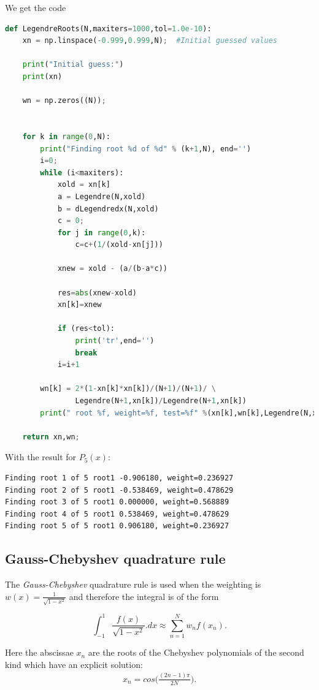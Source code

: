 \documentclass[11pt,letterpaper,titlepage]{article}
\newcommand{\beqn}{\begin{equation}
	\begin{aligned}}
\newcommand{\eeqn}{\end{aligned}
	\end{equation}}
\numberwithin{equation}{section}
\begin{document}
\begin{appendices}
We get the code

\begin{lstlisting}[language=python]
def LegendreRoots(N,maxiters=1000,tol=1.0e-10):
    xn = np.linspace(-0.999,0.999,N);  #Initial guessed values

    print("Initial guess:")
    print(xn)

    wn = np.zeros((N));
    
    
    for k in range(0,N):
        print("Finding root %d of %d" % (k+1,N), end='')
        i=0;
        while (i<maxiters):
            xold = xn[k]
            a = Legendre(N,xold)
            b = dLegendredx(N,xold)
            c = 0;
            for j in range(0,k):
                c=c+(1/(xold-xn[j]))
            
            xnew = xold - (a/(b-a*c))
            
            res=abs(xnew-xold)
            xn[k]=xnew

            if (res<tol):
                print('tr',end='')
                break
            i=i+1
        
        wn[k] = 2*(1-xn[k]*xn[k])/(N+1)/(N+1)/ \
                Legendre(N+1,xn[k])/Legendre(N+1,xn[k])
        print(" root %f, weight=%f, test=%f" %(xn[k],wn[k],Legendre(N,xn[k])))
        
    return xn,wn;
\end{lstlisting}

With the result for $P_5(x)$:
\begin{verbatim}
Finding root 1 of 5 root1 -0.906180, weight=0.236927
Finding root 2 of 5 root1 -0.538469, weight=0.478629
Finding root 3 of 5 root1 0.000000, weight=0.568889
Finding root 4 of 5 root1 0.538469, weight=0.478629
Finding root 5 of 5 root1 0.906180, weight=0.236927
\end{verbatim}

\vspace{1cm}
\subsection{Gauss-Chebyshev quadrature rule}
The \textit{Gauss-Chebyshev} quadrature rule is used when the weighting is $w(x)=\frac{1}{\sqrt{1-x^2}}$ and therefore the integral is of the form

$$
\int_{-1}^1 \frac{f(x)}{\sqrt{1-x^2}}.dx \approx \sum_{n=1}^N w_n f(x_n).
$$

Here the abscissae $x_n$ are the roots of the Chebyshev polynomials of the second kind which have an explicit solution:
\beqn
x_n = cos\biggr(\frac{(2n-1)\pi}{2N} \biggr).
\eeqn


\end{appendices}
\end{document}
